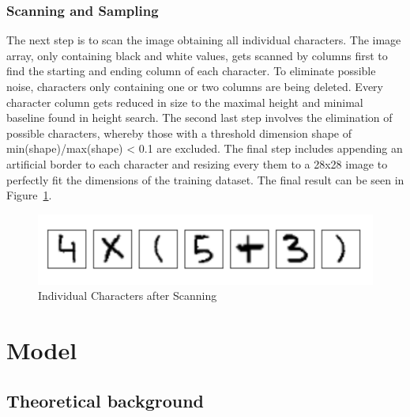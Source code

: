 \documentclass[@CLASSOPTIONS@]{tumarticle}
\begin{document}
\subsubsection{Scanning and Sampling}

The next step is to scan the image obtaining all individual characters.
The image array, only containing black and white values, gets scanned by columns first to find the starting
and ending column of each character.
To eliminate possible noise, characters only containing one or two columns are being deleted.
Every character column gets reduced in size to the maximal height and minimal baseline found in height search.
The second last step involves the elimination of possible characters, whereby those with a threshold
dimension shape of min(shape)/max(shape) < 0.1 are excluded.
The final step includes appending an artificial border to each character and resizing every them to a 28x28 image to
perfectly fit the dimensions of the training dataset.
The final result can be seen in Figure~\ref{Fig:Data6}.

\begin{figure}
    \begin{minipage}{0.48\textwidth}
     \centering
     \includegraphics[width=.9\linewidth]{figures/real_data_3}
     \caption{Individual Characters after Scanning}\label{Fig:Data6}
   \end{minipage}
\end{figure}

\section{Model}
\label{sec:implementation}


\subsection{Theoretical background}
\end{document}
